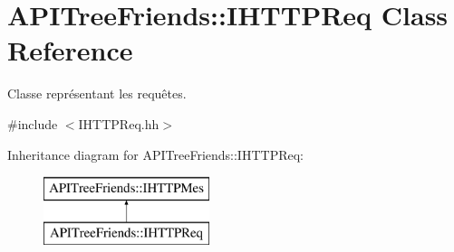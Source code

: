 \hypertarget{class_a_p_i_tree_friends_1_1_i_h_t_t_p_req}{}\section{A\+P\+I\+Tree\+Friends\+:\+:I\+H\+T\+T\+P\+Req Class Reference}
\label{class_a_p_i_tree_friends_1_1_i_h_t_t_p_req}


Classe représentant les requêtes.  




{\ttfamily \#include $<$I\+H\+T\+T\+P\+Req.\+hh$>$}

Inheritance diagram for A\+P\+I\+Tree\+Friends\+:\+:I\+H\+T\+T\+P\+Req\+:\begin{figure}[H]
\begin{center}
\leavevmode
\includegraphics[height=2.000000cm]{class_a_p_i_tree_friends_1_1_i_h_t_t_p_req}
\end{center}
\end{figure}
